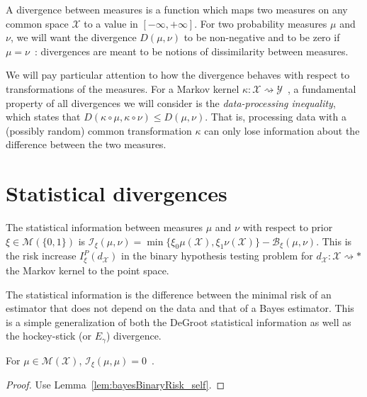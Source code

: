 A divergence between measures is a function which maps two measures on any common space $\mathcal X$ to a value in $[-\infty, +\infty]$.
For two probability measures $\mu$ and $\nu$, we will want the divergence $D(\mu, \nu)$ to be non-negative and to be zero if $\mu = \nu$~: divergences are meant to be notions of dissimilarity between measures.

We will pay particular attention to how the divergence behaves with respect to transformations of the measures.
For a Markov kernel $\kappa : \mathcal X \rightsquigarrow \mathcal Y$~, a fundamental property of all divergences we will consider is the \emph{data-processing inequality}, which states that $D(\kappa \circ \mu, \kappa \circ \nu) \le D(\mu, \nu)$.
That is, processing data with a (possibly random) common transformation $\kappa$ can only lose information about the difference between the two measures.

\section{Statistical divergences}

\begin{definition}
  \label{def:statInfo}
  \leanok
  The statistical information between measures $\mu$ and $\nu$ with respect to prior $\xi \in \mathcal M(\{0,1\})$ is
  $\mathcal I_\xi(\mu, \nu) = \min\{\xi_0 \mu(\mathcal X), \xi_1 \nu(\mathcal X)\} - \mathcal B_\xi(\mu, \nu)$.
  This is the risk increase $I_\xi^P(d_{\mathcal X})$ in the binary hypothesis testing problem for $d_{\mathcal X} : \mathcal X \rightsquigarrow *$ the Markov kernel to the point space.
\end{definition}

The statistical information is the difference between the minimal risk of an estimator that does not depend on the data and that of a Bayes estimator.
This is a simple generalization of both the DeGroot statistical information as well as the hockey-stick (or $E_\gamma$) divergence.

\begin{lemma}
  \label{lem:statInfo_self}
  \leanok
  For $\mu \in \mathcal M(\mathcal X)$, $\mathcal I_\xi(\mu, \mu) = 0$~.
\end{lemma}

\begin{proof}\leanok
{}
Use Lemma~\ref{lem:bayesBinaryRisk_self}.
\end{proof}


